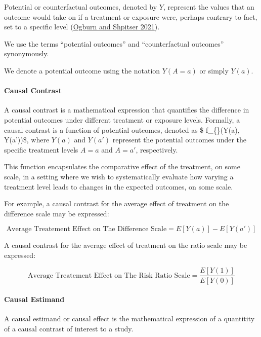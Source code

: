 \documentclass[
  singlecolumn]{article}
\let\oldparagraph\paragraph
\renewcommand{\paragraph}[1]{\oldparagraph{#1}\mbox{}}
\begin{document}
Potential or counterfactual outcomes, denoted by \(Y\), represent the
values that an outcome would take on if a treatment or exposure were,
perhaps contrary to fact, set to a specific level
(\protect\hyperlink{ref-ogburn2021}{Ogburn and Shpitser 2021}).

We use the terms ``potential outcomes'' and ``counterfactual outcomes''
synonymously.

We denote a potential outcome using the notation \(Y(A = a)\) or simply
\(Y(a)\).

\hypertarget{causal-contrast}{%
\paragraph{\texorpdfstring{\textbf{Causal
Contrast}}{Causal Contrast}}\label{causal-contrast}}

A causal contrast is a mathematical expression that quantifies the
difference in potential outcomes under different treatment or exposure
levels. Formally, a causal contrast is a function of potential outcomes,
denoted as \$ f\_\{\}(Y(a), Y(a'))\$, where \(Y(a)\) and
\(Y(a')\) represent the potential outcomes under the specific treatment
levels \(A = a\) and \(A = a'\), respectively.

This function encapsulates the comparative effect of the treatment, on
some scale, in a setting where we wish to systematically evaluate how
varying a treatment level leads to changes in the expected outcomes, on
some scale.

For example, a causal contrast for the average effect of treatment on
the difference scale may be expressed:

\[\text{Average Treatement Effect on The Difference Scale} = E[Y(a)] - E[Y(a')]\]

A causal contrast for the average effect of treatment on the ratio scale
may be expressed:

\[\text{Average Treatement Effect on The Risk Ratio Scale} = \frac{E[Y(1)]}{E[Y(0)]}\]

\hypertarget{causal-estimand}{%
\paragraph{\texorpdfstring{\textbf{Causal
Estimand}}{Causal Estimand}}\label{causal-estimand}}

A causal estimand or causal effect is the mathematical expression of a
quantitity of a causal contrast of interest to a study.
\end{document}
